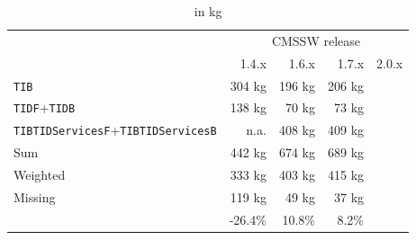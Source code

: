 \documentclass{cmspaper}
\begin{document}
\begin{table}[h!]
  \caption{in kg }
  \label{tab:mass_version}
  \begin{center}
    \begin{tabular}{lrrrr}
        & \multicolumn{4}{c}{CMSSW release} \\
        &  1.4.x  &  1.6.x  &  1.7.x  &  2.0.x \\
       \hline
      {\tt TIB}            & 304 kg & 196 kg & 206 kg &  \\
      {\tt TIDF}+{\tt TIDB}            & 138 kg &  70 kg &  73 kg & \\
      {\tt TIBTIDServicesF}+{\tt TIBTIDServicesB} &  n.a.  & 408 kg & 409 kg & \\
      Sum            & 442 kg & 674 kg & 689 kg & \\
       \hline
      Weighted       & 333 kg & 403 kg & 415 kg & \\
      Missing        & 119 kg &  49 kg &  37 kg & \\
                     & -26.4\% & 10.8\% & 8.2\% &\\
       \hline
    \end{tabular}
  \end{center}
\end{table}
\end{document}
